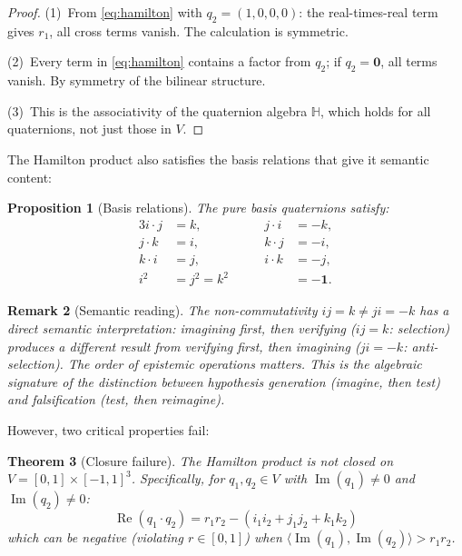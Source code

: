 \documentclass[11pt,a4paper]{article}
\newtheorem{theorem}{Theorem}
\newtheorem{proposition}[theorem]{Proposition}
\newtheorem{remark}[theorem]{Remark}
\newcommand{\Real}{\operatorname{Re}}
\newcommand{\Imag}{\operatorname{Im}}
\newcommand{\Hq}{\mathbb{H}}
\begin{document}
\begin{proof}
(1)~From \eqref{eq:hamilton} with $q_2 = (1, 0, 0, 0)$: the real-times-real
term gives $r_1$, all cross terms vanish. The calculation is symmetric.

(2)~Every term in \eqref{eq:hamilton} contains a factor from $q_2$; if
$q_2 = \mathbf{0}$, all terms vanish. By symmetry of the bilinear
structure.

(3)~This is the associativity of the quaternion algebra $\Hq$, which
holds for all quaternions, not just those in $V$.
\end{proof}

The Hamilton product also satisfies the basis relations that give it
semantic content:

\begin{proposition}[Basis relations]
\label{prop:basis}
The pure basis quaternions satisfy:
\begin{alignat}{3}
  i \cdot j &= k,  &\qquad j \cdot i &= -k, \label{eq:ij} \\
  j \cdot k &= i,  &\qquad k \cdot j &= -i, \label{eq:jk} \\
  k \cdot i &= j,  &\qquad i \cdot k &= -j, \label{eq:ki} \\
  i^2 &= j^2 = k^2 &&= -\mathbf{1}. \label{eq:squares}
\end{alignat}
\end{proposition}

\begin{remark}[Semantic reading]
The non-commutativity $ij = k \neq ji = -k$ has a direct semantic
interpretation: \emph{imagining first, then verifying} ($ij = k$:
selection) produces a different result from \emph{verifying first, then
imagining} ($ji = -k$: anti-selection). The order of epistemic
operations matters. This is the algebraic signature of the distinction
between hypothesis generation (imagine, then test) and falsification
(test, then reimagine).
\end{remark}

However, two critical properties fail:

\begin{theorem}[Closure failure]
\label{thm:closure-failure}
The Hamilton product is not closed on $V = [0,1] \times [-1,1]^3$.
Specifically, for $q_1, q_2 \in V$ with $\Imag(q_1) \neq 0$ and
$\Imag(q_2) \neq 0$:
\begin{equation}
\Real(q_1 \cdot q_2) = r_1 r_2 - (i_1 i_2 + j_1 j_2 + k_1 k_2)
\end{equation}
which can be negative (violating $r \in [0,1]$) when
$\langle \Imag(q_1), \Imag(q_2) \rangle > r_1 r_2$.
\end{theorem}
\end{document}
